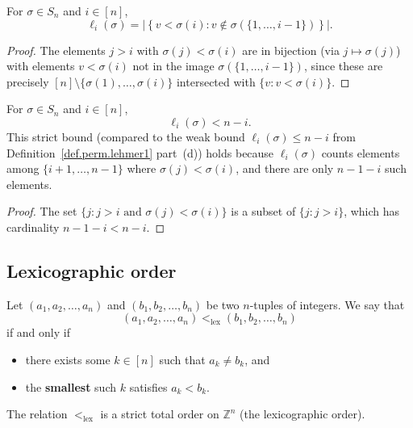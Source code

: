 \begin{lemma}
\label{lem.perm.lehmerEntry_eq_card_filter}
\leanhelper
\leanok
For $\sigma \in S_n$ and $i \in [n]$,
\[
\ell_i(\sigma) = \left|\left\{ v < \sigma(i) : v \notin \sigma(\{1,\ldots,i-1\}) \right\}\right|.
\]
\end{lemma}

\begin{proof}
\leanok
The elements $j > i$ with $\sigma(j) < \sigma(i)$ are in bijection
(via $j \mapsto \sigma(j)$) with elements $v < \sigma(i)$ not in the image
$\sigma(\{1,\ldots,i-1\})$, since these are precisely
$[n] \setminus \{\sigma(1),\ldots,\sigma(i)\}$ intersected with $\{v : v < \sigma(i)\}$.
\end{proof}

\begin{lemma}
\label{lem.perm.lehmerEntry_lt}
\leanhelper
\leanok
For $\sigma \in S_n$ and $i \in [n]$,
\[
\ell_i(\sigma) < n - i.
\]
This strict bound (compared to the weak bound $\ell_i(\sigma) \leq n - i$
from Definition~\ref{def.perm.lehmer1} part~(d)) holds because
$\ell_i(\sigma)$ counts elements among $\{i+1, \ldots, n-1\}$ where
$\sigma(j) < \sigma(i)$, and there are only $n - 1 - i$ such elements.
\end{lemma}

\begin{proof}
\leanok
The set $\{j : j > i \text{ and } \sigma(j) < \sigma(i)\}$ is a subset
of $\{j : j > i\}$, which has cardinality $n - 1 - i < n - i$.
\end{proof}

\subsection{Lexicographic order}

\begin{definition}
\label{def.perm.lehmer.lex-ord}
\leantarget
\leanok
Let $\left(a_{1},a_{2},\ldots,a_{n}\right)$
and $\left(b_{1},b_{2},\ldots,b_{n}\right)$ be two $n$-tuples of integers.
We say that
\[
\left(a_{1},a_{2},\ldots,a_{n}\right) <_{\operatorname{lex}}\left(
b_{1},b_{2},\ldots,b_{n}\right)
\]
if and only if
\begin{itemize}
\item there exists some $k\in\left[n\right]$ such that $a_{k}\neq b_{k}$, and
\item the \textbf{smallest} such $k$ satisfies $a_{k}<b_{k}$.
\end{itemize}
The relation $<_{\operatorname{lex}}$ is a strict total order on $\mathbb{Z}^n$
(the lexicographic order).
\leanok
\end{definition}

